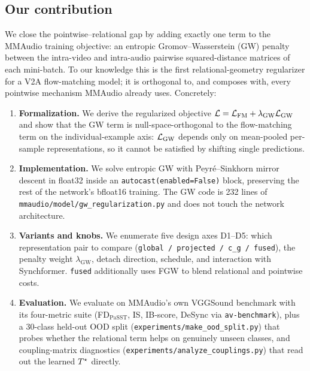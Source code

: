 \subsection{Our contribution}
\label{sec:intro:contribution}
We close the pointwise--relational gap by adding exactly one
term to the MMAudio training objective: an entropic
Gromov--Wasserstein (GW) \citep{peyre2016gromov} penalty between
the intra-video and intra-audio pairwise squared-distance
matrices of each mini-batch. To our knowledge this is the first
relational-geometry regularizer for a V2A flow-matching model;
it is orthogonal to, and composes with, every pointwise
mechanism MMAudio already uses. Concretely:
\begin{enumerate}[leftmargin=*,topsep=2pt]
  \item \textbf{Formalization.} We derive the regularized
    objective $\mathcal{L} = \mathcal{L}_{\mathrm{FM}} + \lambda_{\mathrm{GW}} \mathcal{L}_{\mathrm{GW}}$
    and show that the GW term is null-space-orthogonal to the
    flow-matching term on the individual-example axis: $\mathcal{L}_{\mathrm{GW}}$
    depends only on mean-pooled per-sample representations, so it
    cannot be satisfied by shifting single predictions.
  \item \textbf{Implementation.} We solve entropic GW with
    Peyr\'e--Sinkhorn mirror descent
    \citep{peyre2016gromov,cuturi2013sinkhorn} in float32 inside
    an \texttt{autocast(enabled=False)} block, preserving the
    rest of the network's bfloat16 training. The GW code is 232
    lines of \texttt{mmaudio/model/gw\_regularization.py} and
    does not touch the network architecture.
  \item \textbf{Variants and knobs.} We enumerate five design
    axes D1--D5: which representation pair to compare
    (\texttt{global / projected / c\_g / fused}), the penalty
    weight $\lambda_{\mathrm{GW}}$, detach direction, schedule,
    and interaction with Synchformer.
    \texttt{fused} additionally uses FGW \citep{vayer2020fused}
    to blend relational and pointwise costs.
  \item \textbf{Evaluation.} We evaluate on MMAudio's own
    VGGSound benchmark with its four-metric suite
    (FD$_{\text{PaSST}}$, IS, IB-score, DeSync via
    \texttt{av-benchmark}), plus a 30-class held-out OOD split
    (\texttt{experiments/make\_ood\_split.py}) that probes
    whether the relational term helps on genuinely unseen
    classes, and coupling-matrix diagnostics
    (\texttt{experiments/analyze\_couplings.py}) that read
    out the learned $T^{\star}$ directly.
\end{enumerate}


